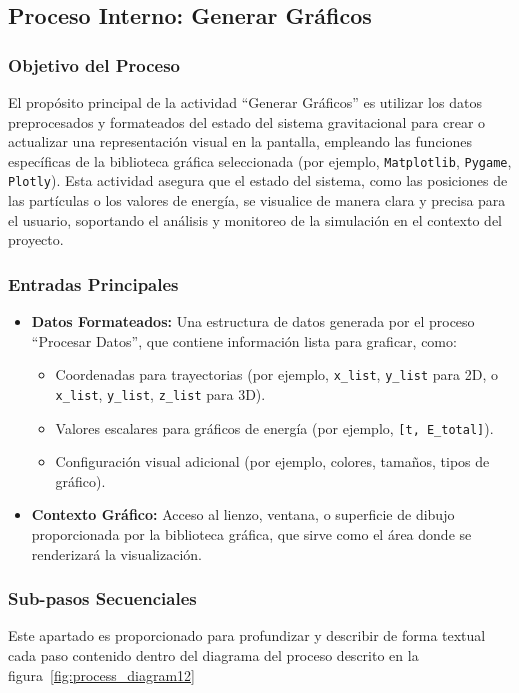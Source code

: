 \subsection{Proceso Interno: Generar Gráficos}

\subsubsection{Objetivo del Proceso}
El propósito principal de la actividad ``Generar Gráficos'' es utilizar los datos preprocesados y formateados del estado del sistema gravitacional para crear o actualizar una representación visual en la pantalla, empleando las funciones específicas de la biblioteca gráfica seleccionada (por ejemplo, \texttt{Matplotlib}, \texttt{Pygame}, \texttt{Plotly}). Esta actividad asegura que el estado del sistema, como las posiciones de las partículas o los valores de energía, se visualice de manera clara y precisa para el usuario, soportando el análisis y monitoreo de la simulación en el contexto del proyecto.

\subsubsection{Entradas Principales}
\begin{itemize}
    \item \textbf{Datos Formateados:}
    Una estructura de datos generada por el proceso ``Procesar Datos'', que contiene información lista para graficar, como:
    \begin{itemize}
        \item Coordenadas para trayectorias (por ejemplo, \texttt{x\_list}, \texttt{y\_list} para 2D, o \texttt{x\_list}, \texttt{y\_list}, \texttt{z\_list} para 3D).
        \item Valores escalares para gráficos de energía (por ejemplo, \texttt{[t, E\_total]}).
        \item Configuración visual adicional (por ejemplo, colores, tamaños, tipos de gráfico).
    \end{itemize}
    \item \textbf{Contexto Gráfico:}
    Acceso al lienzo, ventana, o superficie de dibujo proporcionada por la biblioteca gráfica, que sirve como el área donde se renderizará la visualización.
\end{itemize}

\subsubsection{Sub-pasos Secuenciales}
Este apartado es proporcionado para profundizar y describir de forma textual cada paso contenido dentro del diagrama del proceso descrito en la figura~\ref{fig:process_diagram12}

